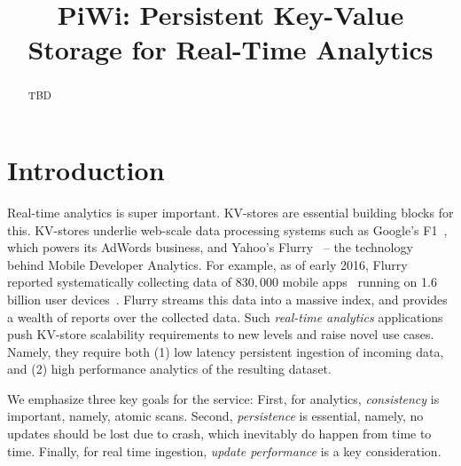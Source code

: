 \documentclass[10pt,preprint,numbers]{sigplanconf}
\date{}
\newcommand{\inred}[1]{{\color{red}{#1}}}
\newcommand{\Idit}[1]{\inred{[Idit: #1]}}
\newcommand{\sys}{PiWi}
\begin{document}
\title{\sys: Persistent Key-Value Storage for Real-Time Analytics} 
\maketitle

\begin{abstract}

TBD

\end{abstract}

\section{Introduction}

Real-time analytics is super important. KV-stores are essential building blocks for this.
\Idit{The paragraph below is copy-paste from KiWi, need to reword.}
KV-stores underlie web-scale data processing systems such as
Google's F1~\cite{Shute2013}, which powers its AdWords
business, and Yahoo's Flurry~\cite{flurry} --
the technology behind Mobile Developer Analytics.
For example,
as of early 2016,  Flurry  reported systematically collecting data of $830\!,000$ mobile
apps~\cite{appmatrix}
running on 1.6 billion
user devices~\cite{phablet}.
Flurry streams  this data into a massive index, and provides
a wealth of reports over the collected data.
Such
\emph{real-time analytics}  applications push KV-store scalability requirements to new levels and raise novel use cases.
Namely, they require
both
(1) low latency persistent ingestion of incoming data, and (2) high performance analytics of the resulting dataset.

We emphasize three key goals for the service: First, for analytics, \emph{consistency} is important, namely, atomic scans. 
Second, \emph{persistence} is essential, namely, no updates should be lost due to crash, which inevitably do happen from time to time\cite{?}.
Finally, for real time ingestion, \emph{update performance} is a key consideration. 
\end{document}
